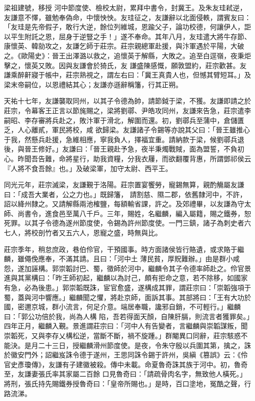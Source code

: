 \begin{pinyinscope}
 梁祖建號，移授
 河中節度使、檢校太尉，累拜中書令，封冀王。及朱友珪弒逆，友謙意不懌，雖勉奉偽命，中懷怏怏。友珪征之，友謙辭以北面侵軼，謂賓友曰：「友珪是先帝假子，敢行大逆，餘位列維城，恩踰父子，論功校德，何讓伊人，詎以平生附託之恩，屈身于逆豎之手！」遂不奉命。其年八月，友珪遣大將牛存節、康懷英、韓勍攻之，友謙乞師于莊宗。莊宗親總軍赴援，與汴軍遇於平陽，大破之。《歐陽史》：晉王出澤潞以救之，追懷英于解縣，大敗之。追至白逕嶺，夜秉炬擊之，懷英又敗。因與友謙會於猗氏，友
 謙盛陳感慨，願敦盟約，莊宗歡甚。友謙乘醉鼾寢于帳中，莊宗熟視之，謂左右曰：「冀王真貴人也，但憾其臂短耳。」及梁末帝嗣位，以恩禮結其心；友謙亦遜辭稱籓，行其正朔。



 天祐十七年，友謙襲取同州，以其子令德為帥，請節鉞于梁，不獲。友謙即請之於莊宗，令幕客王正言以節旄賜之，梁將劉鄩、尹皓攻同州，友謙來告急，莊宗遣李嗣昭、李存審將兵赴之，敗汴軍于滑北，解圍而還。初，劉鄩兵至蒲中，倉儲匱乏，人心離貳，軍民將校，咸
 欲歸梁。友謙諸子令錫等亦說其父曰：「晉王雖推心于我，然懸兵赴援，急維相應，寧我負人，擇福宜重。請納款于梁，候劉鄩兵退後，與晉王修好。」友謙曰：「晉王親赴予急，夜半秉燭戰賊，面為盟誓，不負初心。昨聞吾告難，命將星行，助我資糧，分我衣屨，而欲翻覆背惠，所謂鄧祁侯云『人將不食吾餘』也。」及破梁軍，加守太尉、西平王。



 同光元年，莊宗滅梁，友謙覲于洛陽。莊宗置宴饗勞，寵錫無算，親酌觴屬友謙曰：「成吾大業者，公之力也。」既歸籓，
 請割慈、隰二郡，依舊隸河中，不許，詔以絳州隸之。又請解縣兩池榷鹽，每額輸省課，許之。及郊禮畢，以友謙為守太師、尚書令，進食邑至萬八千戶。三年，賜姓，名繼麟，編入屬籍，賜之鐵券，恕死罪。以其子令德為遂州節度使，令錫為許州節度使。一門三鎮，諸子為刺史者六七人，將校剖竹者又五六人，恩寵之盛，時無與比。



 莊宗季年，稍怠庶政，巷伯伶官，干預國事。時方面諸侯皆行賂遺，或求賂于繼麟，雖僶俛應奉，不滿其請。且曰：「河中土
 薄民貧，厚貺難辦。」由是群小咸怨，遂加誣構。郭崇韜討巴、蜀，徵師於河中，繼麟令其子令德率師赴之。伶官景進與其黨構曰：「昨王師初起，繼麟以為討己，頗有拒命之意，若不除移，如國家有急，必為後患。」郭崇韜既誅，宦官愈盛，遂構成其罪，謂莊宗曰：「崇韜強項于蜀，蓋與河中響應。」繼麟聞之懼，將赴京師，面訴其事。其部將曰：「王有大功於國，密邇京城，群小流言，何足介意。端居奉職，讒邪自銷，不可輕行。」繼麟曰：「郭公功倍於我，尚為人構
 陷，吾若得面天顏，自陳肝膈，則流言者獲罪矣。」四年正月，繼麟入覲。景進謂莊宗曰：「河中人有告變者，言繼麟與崇韜謀叛，聞崇韜死，又與李存乂構松逆，當斷不斷，禍不旋踵。」群閹異口同辭，莊宗駭惑不能決。是月二十三日，授繼麟滑州節度使。是夜，令朱守殷以兵圍其第，擒之，誅於徽安門外；詔繼岌誅令德于遂州，王思同誅令錫于許州，吳縝《篡誤》云：《伶官史彥瓊傳》，友謙有子建徽被殺。傳中未載。命夏魯奇誅其族于河中。初，魯奇至，友謙妻張氏率其家屬二百餘
 口見魯奇曰：「請疏骨肉名字，無致他人橫死。」將刑，張氏持先賜鐵券授魯奇曰：「皇帝所賜也。」是時，百口塗地，冤酷之聲，行路流涕。




\end{pinyinscope}
